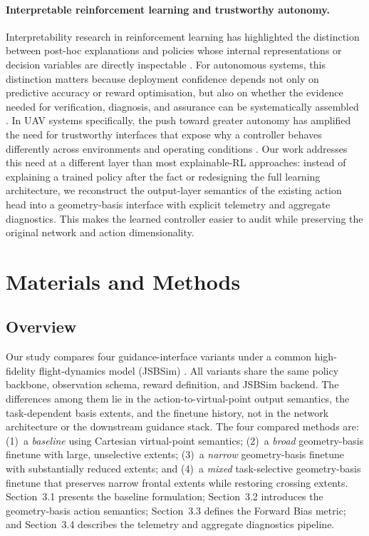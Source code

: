 \documentclass[drones,article,submit,pdftex,moreauthors]{Definitions/mdpi}
\begin{document}
\paragraph{Interpretable reinforcement learning and trustworthy autonomy.}
Interpretability research in reinforcement learning has highlighted the distinction between post-hoc explanations and policies whose internal representations or decision variables are directly inspectable \cite{glanois2024,paleja2022}. For autonomous systems, this distinction matters because deployment confidence depends not only on predictive accuracy or reward optimisation, but also on whether the evidence needed for verification, diagnosis, and assurance can be systematically assembled \cite{paterson2025,gunning2019}. In UAV systems specifically, the push toward greater autonomy has amplified the need for trustworthy interfaces that expose why a controller behaves differently across environments and operating conditions \cite{elmokadem2021,thomas2021}. Our work addresses this need at a different layer than most explainable-RL approaches: instead of explaining a trained policy after the fact or redesigning the full learning architecture, we reconstruct the output-layer semantics of the existing action head into a geometry-basis interface with explicit telemetry and aggregate diagnostics. This makes the learned controller easier to audit while preserving the original network and action dimensionality.

\section{Materials and Methods}

\subsection{Overview}

Our study compares four guidance-interface variants under a common high-fidelity flight-dynamics model (JSBSim) \cite{lai2026aerospace}. All variants share the same policy backbone, observation schema, reward definition, and JSBSim backend. The differences among them lie in the action-to-virtual-point output semantics, the task-dependent basis extents, and the finetune history, not in the network architecture or the downstream guidance stack. The four compared methods are: (1)~a \emph{baseline} using Cartesian virtual-point semantics; (2)~a \emph{broad} geometry-basis finetune with large, unselective extents; (3)~a \emph{narrow} geometry-basis finetune with substantially reduced extents; and (4)~a \emph{mixed} task-selective geometry-basis finetune that preserves narrow frontal extents while restoring crossing extents. Section~3.1 presents the baseline formulation; Section~3.2 introduces the geometry-basis action semantics; Section~3.3 defines the Forward Bias metric; and Section~3.4 describes the telemetry and aggregate diagnostics pipeline.
\end{document}
